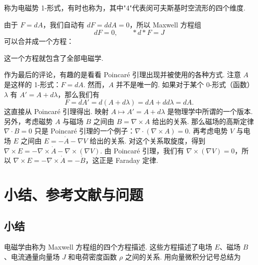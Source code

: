 称为电磁势 1-形式，有时也称为，其中"4"代表闵可夫斯基时空流形的四个维度.

由于 $F=dA$，我们自动有 $dF=ddA=0$，所以 Maxwell 方程组
\[
dF=0,\qquad\ast d\ast F=J
\]
可以合并成一个方程：

\begin{center}
\end{center}

这一个方程就包含了全部电磁学.

作为最后的评论，有趣的是看看 Poincaré 引理出现并被使用的各种方式. 注意 $A$ 是这样的 1-形式：$F=dA$. 然而，$A$ 并不是唯一的. 如果对于某个 0-形式（函数）$\lambda$ 有 $A'=A+d\lambda$，那么我们有
\[
F=dA'=d(A+d\lambda)=dA+dd\lambda=dA .
\]
这直接从 Poincaré 引理得出. 映射 $A\longmapsto A'=A+d\lambda$ 是物理学中所谓的一个版本. 另外，考虑磁势 $A$ 与磁场 $B$ 之间由 $B=\nabla\times A$ 给出的关系. 那么磁场的高斯定律 $\nabla\cdot B=0$ 只是 Poincaré 引理的一个例子：$\nabla\cdot(\nabla\times A)=0$. 再考虑电势 $V$ 与电场 $E$ 之间由 $E=-\dot{A}-\nabla V$ 给出的关系. 对这个关系取旋度，得到 $\nabla\times E=-\nabla\times\dot{A}-\nabla\times(\nabla V)$. 由 Poincaré 引理，我们有 $\nabla\times(\nabla V)=0$，所以 $\nabla\times E=-\nabla\times\dot{A}=-\dot{B}$，这正是 Faraday 定律.

\section{小结、参考文献与问题}

\subsection{小结}

电磁学由称为 Maxwell 方程组的四个方程描述. 这些方程描述了电场 $E$、磁场 $B$、电流通量向量场 $J$ 和电荷密度函数 $\rho$ 之间的关系. 用向量微积分记号总结为

\begin{center}
\end{center}

